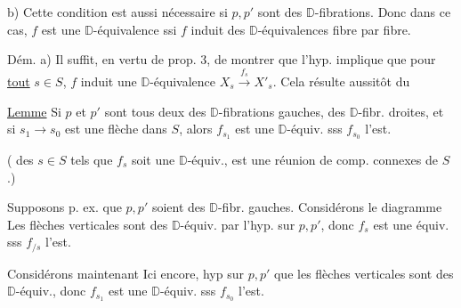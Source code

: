 
b) Cette condition est aussi nécessaire  si $p,p'$ sont des $\mathbb D$-fibrations. Donc dans ce cas, $f$ est une $\mathbb D$-équivalence ssi $f$ induit des $\mathbb D$-équivalences fibre par fibre.



Dém. a) Il suffit, en vertu de prop. 3, de montrer que l'hyp. implique que pour \uline{tout} $s\in S$, $f$ induit une $\mathbb D$-équivalence $X_s\xrightarrow{f_s}X'_s$. Cela résulte  aussitôt du 

\uline{Lemme}  Si $p$ et $p'$ sont tous deux  des $\mathbb D$-fibrations gauches,  des $\mathbb D$-fibr. droites, et si $s_1\longrightarrow s_0$ est une flèche dans $S$, alors $f_{s_1}$ est une $\mathbb D$-équiv. sss $f_{s_0}$ l'est.

(  des $s\in S$ tels que $f_s$ soit une $\mathbb D$-équiv., est une réunion de comp. connexes de $S$.)

Supposons p. ex. que $p,p'$ soient des $\mathbb D$-fibr. gauches. Considérons  le diagramme
Les flèches verticales sont des $\mathbb D$-équiv. par l'hyp. sur $p,p'$, donc $f_s$ est une équiv. sss $f_{/s}$ l'est.

Considérons maintenant
Ici encore,  hyp sur $p,p'$  que les flèches verticales sont des $\mathbb D$-équiv., donc $f_{s_1}$ est une $\mathbb D$-équiv. sss $f_{s_0}$ l'est.

